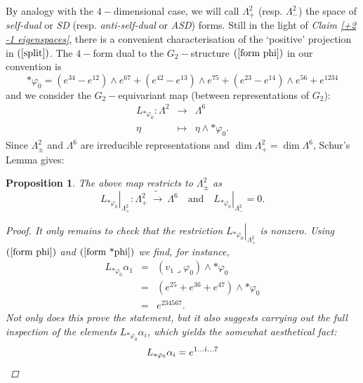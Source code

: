 \documentclass{article}
\newtheorem{proposition}[theorem]{Proposition}
\begin{document}
By analogy with the $4-$dimensional case, we will call $\Lambda _{+}^{2}$
(resp. $\Lambda _{-}^{2}$) the space of \emph{self-dual }or \emph{SD} (resp. \emph{anti-self-dual} or \emph{ASD}) forms. 
Still in the light of \emph{Claim \ref{+2 -1 eigenspaces}}, there is
a convenient characterisation of the `positive' projection in $\left( \ref%
{split}\right) $. The $4-$form  dual to the $G_{2}-$structure $%
\left( \ref{form phi}\right) $ in our convention is%
\begin{equation}
\ast \varphi _{0}=\left( e^{34}-e^{12}\right) \wedge e^{67}+\left(
e^{42}-e^{13}\right) \wedge e^{75}+\left( e^{23}-e^{14}\right) \wedge
e^{56}+e^{1234}  \label{form *phi}
\end{equation}%
and we consider the  $G_{2}-$equivariant map (between representations of $G_2$):
\begin{eqnarray*}        \label{eq Lphi0}
        L_{\ast \varphi _{0}} : \Lambda ^{2} 
        &\rightarrow& \Lambda ^{6}\\ 
        \eta &\mapsto& \eta \wedge \ast \varphi _{0}.
\end{eqnarray*}
Since $\Lambda _{\pm }^{2}$ and $%
\Lambda ^{6}$ are irreducible representations and $\dim \Lambda
_{+}^{2}=\dim \Lambda ^{6}$, Schur's Lemma gives:

\begin{proposition}     \label{prop +-projection}
The above map restricts to $\Lambda^2_{\pm}$ as $$\left. L_{\ast \varphi _{0}} \right\vert _{\Lambda
_{+}^{2}}:\Lambda _{+}^{2} \: \tilde{\rightarrow} \: \Lambda^{6} 
\quad\text{and}\quad\left. L_{\ast \varphi _{0}}\right\vert _{\Lambda
_{-}^{2}}=0.$$
\begin{proof}
It only remains to check that the restriction $\left. L_{\ast \varphi _{0}} \right\vert _{\Lambda_{+}^{2}}$ is nonzero. Using $\left( \ref{form phi}\right) $ and $\left( \ref{form *phi}\right)$ we find, for instance, 
\begin{eqnarray*}
        L_{\ast \varphi _{0}}\alpha _{1} 
        &=&\left( v_{1}\lrcorner \varphi_{0}\right)\wedge\ast\varphi_{0}\\
        &=&\left( e^{25}+e^{36}+e^{47}\right) \wedge \ast\varphi_{0} \\
        &=&e^{234567}.
\end{eqnarray*}%
Not only does this prove the statement, but it also suggests carrying out the
full inspection of the elements $L_{\ast \varphi _{0}}\alpha _{i}$, which yields the somewhat aesthetical fact:
\begin{equation*}
        L_{\ast \varphi _{0}}\alpha _{i}=e^{1...\hat{\imath}...7}
        \qedhere
\end{equation*}
\end{proof}
\end{proposition}
\end{document}
